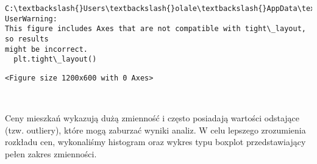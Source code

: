 \documentclass[11pt]{article}
\begin{document}
    \begin{Verbatim}[commandchars=\\\{\}]
C:\textbackslash{}Users\textbackslash{}olale\textbackslash{}AppData\textbackslash{}Local\textbackslash{}Temp\textbackslash{}ipykernel\_12048\textbackslash{}2023313051.py:9: UserWarning:
This figure includes Axes that are not compatible with tight\_layout, so results
might be incorrect.
  plt.tight\_layout()
    \end{Verbatim}

    
    \begin{Verbatim}[commandchars=\\\{\}]
<Figure size 1200x600 with 0 Axes>
    \end{Verbatim}

    
    \begin{center}
    \end{center}
    { \hspace*{\fill} \\}
    
    Ceny mieszkań wykazują dużą zmienność i często posiadają wartości
odstające (tzw. outliery), które mogą zaburzać wyniki analiz. W celu
lepszego zrozumienia rozkładu cen, wykonaliśmy histogram oraz wykres
typu boxplot przedstawiający pełen zakres zmienności.
\end{document}
